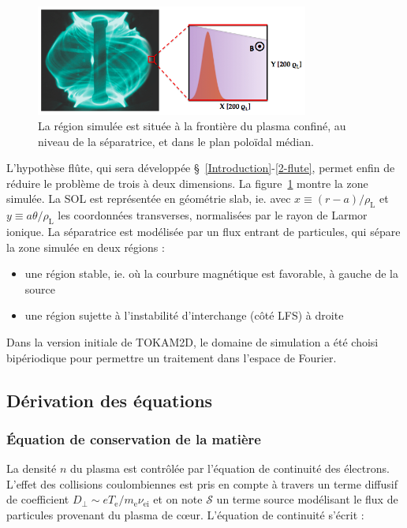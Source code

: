 \begin{refsection}
\begin{figure}[!htbp]
\centering
    \includegraphics[width=0.8\textwidth]{figures/2-tokamSimDomain.png}
    \caption{La région simulée est située à la frontière du plasma confiné,
    au niveau de la séparatrice, et dans le plan poloïdal médian.}
    \label{2-figTokamGeom}
\end{figure}

L'hypothèse flûte, qui sera développée \S~\ref{Introduction}-\ref{2-flute},
permet enfin de réduire le problème de trois à deux dimensions.
La figure~\ref{2-figTokamGeom} montre la zone simulée. La SOL est représentée
en géométrie slab, ie. avec $x\equiv(r-a)/\rho_\text{L}$ et $y\equiv
a\theta/\rho_\text{L}$ les coordonnées transverses, normalisées par le rayon
de Larmor ionique. La séparatrice est modélisée par un flux entrant de particules,
qui sépare la zone simulée en deux régions :

\begin{itemize}
  \item une région stable, ie. où la courbure magnétique est favorable, à gauche
  de la source
  \item une région sujette à l'instabilité d'interchange (côté LFS) à droite
 \end{itemize}
 
Dans la version initiale de TOKAM2D, le domaine de simulation a été choisi
bipériodique pour permettre un traitement dans l'espace
de Fourier.

\subsection{Dérivation des équations}
\subsubsection{Équation de conservation de la matière}
La densité $n$ du plasma est contrôlée par l'équation de continuité des
électrons. L'effet des collisions coulombiennes est pris en compte à travers un
terme diffusif de coefficient $D_\perp\sim eT_\text{e}/m_\text{e}\nu_\text{ei}$
et on note $\mathcal{S}$ un terme source modélisant le flux de particules
provenant du plasma de c\oe{}ur. L'équation de continuité s'écrit :


\end{refsection}
